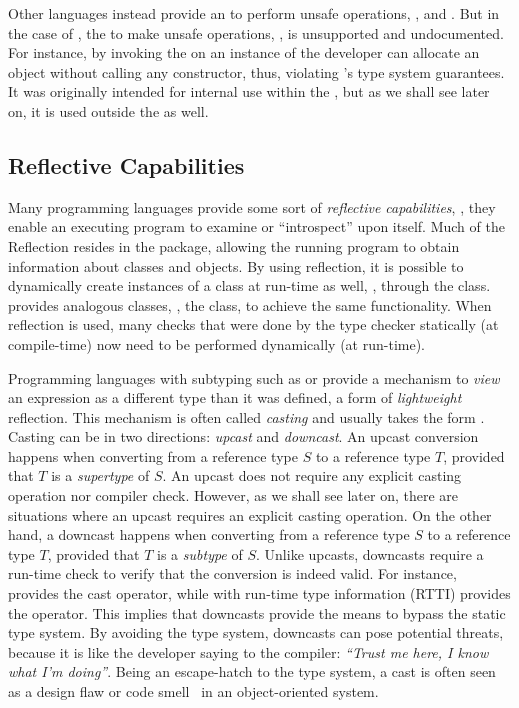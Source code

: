 Other languages instead provide an \api{} to perform unsafe operations,
\eg{}, \haskell{}%
and \java{}.
But in the case of \java{}, the \api{} to make unsafe operations,
\smu{}, is unsupported%
and undocumented.
For instance,
by invoking the  on an instance of \smu{}
the developer can allocate an object without calling any constructor,
thus, violating \java{}'s type system guarantees.
It was originally intended for internal use within the \jdk{},
but as we shall see later on, it is used outside the \jdk{} as well.

\subsection*{Reflective Capabilities}

Many programming languages provide some sort of \emph{reflective capabilities},
\ie{}, they enable an executing program to examine or ``introspect'' upon itself.
Much of the \java{} Reflection \api{} resides in the  package,
allowing the running program to obtain information about classes and objects.
By using reflection, it is possible to dynamically create instances of a class at run-time as well, \eg{}, through the  class.
\csharp{} provides analogous classes, \eg{}, the  class,
to achieve the same functionality.
When reflection is used,
many checks that were done by the type checker statically (at compile-time)
now need to be performed dynamically (at run-time).

Programming languages with subtyping such as \java{} or \cpp{} provide a mechanism to \emph{view} an expression as a different type than it was defined, a form of \emph{lightweight} reflection.
This mechanism is often called \emph{casting} and usually takes the form .
Casting can be in two directions: \emph{upcast} and \emph{downcast}.
An upcast conversion happens when converting from a reference type $S$ to a reference type $T$, provided that $T$ is a \emph{supertype} of $S$.
An upcast does not require any explicit casting operation nor compiler check.
However, as we shall see later on, there are situations where an upcast requires an explicit casting operation.
On the other hand, a downcast happens when converting from a reference type $S$ to a reference type $T$, provided that $T$ is a \emph{subtype} of $S$.
Unlike upcasts,
downcasts require a run-time check to verify that the conversion is indeed valid.
For instance, \java{} provides the cast operator, while
\cpp{} with run-time type information (RTTI) provides the  operator.
This implies that downcasts provide the means to bypass the static type system.
By avoiding the type system, downcasts can pose potential threats, because it is like the developer saying to the compiler: \emph{``Trust me here, I know what I'm doing''}.
Being an escape-hatch to the type system,
a cast is often seen as a design flaw or code smell~\citep{tufanoWhenWhyYour2015} in an object-oriented system.

